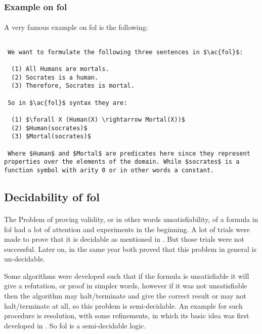 	\subsubsection{Example on \ac{fol}}
	\paragraph{}
	A very famous example on \ac{fol} is the following:
\begin{lstlisting}[caption=Example on \ac{fol},mathescape,breaklines=true,frame=single]

 We want to formulate the following three sentences in $\ac{fol}$:

  (1) All Humans are mortals.
  (2) Socrates is a human.
  (3) Therefore, Socrates is mortal.
  
 So in $\ac{fol}$ syntax they are:

  (1) $\forall X (Human(X) \rightarrow Mortal(X))$
  (2) $Human(socrates)$
  (3) $Mortal(socrates)$
  
 Where $Human$ and $Mortal$ are predicates here since they represent properties over the elements of the domain. While $socrates$ is a function symbol with arity 0 or in other words a constant. 

\end{lstlisting}



\subsection{Decidability of \ac{fol}}
\paragraph{}
The Problem of proving validity, or in other words unsatisfiability, of a formula in \acf{fol} had a lot of attention and experiments in the beginning. A lot of trials were made to prove that it is decidable as mentioned in \cite{SL_14}. But those trials were not successful. Later on, in the same year both \cite{DEC_TUR, DEC_CHURCH} proved that this problem in general is un-decidable.


Some algorithms were developed such that if the formula is unsatisfiable it will give a refutation, or proof in simpler words, however if it was not unsatisfiable then the algorithm may halt/terminate and give the correct result or may not halt/terminate at all, so this problem is semi-decidable. An example for such procedure is resolution, with some refinements, in which its basic idea was first developed in \cite{RES_65}. So \acf{fol} is a semi-decidable logic.



